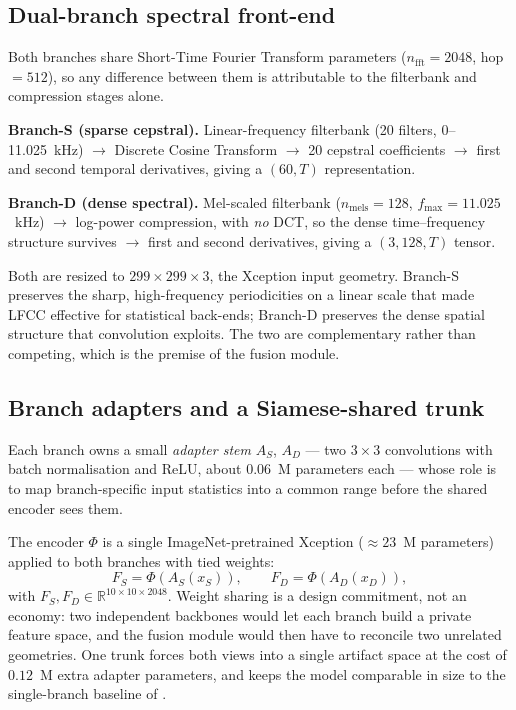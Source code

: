 \documentclass[conference]{IEEEtran}
\renewcommand{\cite}[1]{\unskip}
\begin{document}
\subsection{Dual-branch spectral front-end}
Both branches share Short-Time Fourier Transform parameters
($n_{\mathrm{fft}} = 2048$, hop $= 512$), so any difference between them is
attributable to the filterbank and compression stages alone.

\textbf{Branch-S (sparse cepstral).} Linear-frequency filterbank
(20 filters, 0--11.025~kHz) $\rightarrow$ Discrete Cosine Transform
$\rightarrow$ 20 cepstral coefficients $\rightarrow$ first and second
temporal derivatives, giving a $(60, T)$ representation.

\textbf{Branch-D (dense spectral).} Mel-scaled filterbank
($n_{\mathrm{mels}} = 128$, $f_{\max} = 11.025$~kHz) $\rightarrow$
log-power compression, with \emph{no} DCT, so the dense time--frequency
structure survives $\rightarrow$ first and second derivatives, giving a
$(3, 128, T)$ tensor.

Both are resized to $299 \times 299 \times 3$, the Xception input geometry.
Branch-S preserves the sharp, high-frequency periodicities on a linear
scale that made LFCC effective for statistical back-ends; Branch-D
preserves the dense spatial structure that convolution exploits. The two
are complementary rather than competing, which is the premise of the fusion
module.

\subsection{Branch adapters and a Siamese-shared trunk}
Each branch owns a small \emph{adapter stem} $A_S$, $A_D$ --- two
$3\times3$ convolutions with batch normalisation and ReLU, about $0.06$~M
parameters each --- whose role is to map branch-specific input statistics
into a common range before the shared encoder sees them.

The encoder $\Phi$ is a single ImageNet-pretrained Xception
\cite{chollet2017xception} ($\approx 23$~M parameters) applied to both
branches with tied weights:
\begin{equation}
F_S = \Phi(A_S(x_S)), \qquad F_D = \Phi(A_D(x_D)),
\end{equation}
with $F_S, F_D \in \mathbb{R}^{10 \times 10 \times 2048}$. Weight sharing is
a design commitment, not an economy: two independent backbones would let
each branch build a private feature space, and the fusion module would then
have to reconcile two unrelated geometries. One trunk forces both views
into a single artifact space at the cost of $0.12$~M extra adapter
parameters, and keeps the model comparable in size to the single-branch
baseline of \cite{ahmed2026melspec}.
\end{document}
